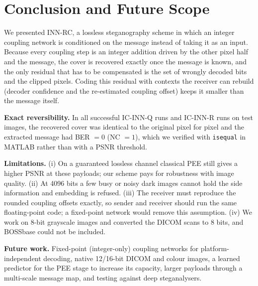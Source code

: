 \section{Conclusion and Future Scope}
We presented INN-RC, a lossless steganography scheme in which an integer coupling network is conditioned on the
message instead of taking it as an input. Because every coupling step is an integer addition driven by the other pixel
half and the message, the cover is recovered exactly once the message is known, and the only residual that has to be
compensated is the set of wrongly decoded bits and the clipped pixels. Coding this residual with contexts the receiver
can rebuild (decoder confidence and the re-estimated coupling offset) keeps it smaller than the message itself.

\textbf{Exact reversibility.} In all \exactQ{} successful IC-INN-Q runs and \exactR{} IC-INN-R runs on \nImgs{} test
images, the recovered cover was identical to the original pixel for pixel and the extracted message had BER $=0$
(NC $=1$), which we verified with \texttt{isequal} in MATLAB rather than with a PSNR threshold.

\textbf{Limitations.} (i) On a guaranteed lossless channel classical PEE still gives a higher PSNR at these payloads;
our scheme pays for robustness with image quality. (ii) At 4096 bits a few busy or noisy dark images cannot hold the
side information and embedding is refused. (iii) The receiver must reproduce the rounded coupling offsets exactly, so
sender and receiver should run the same floating-point code; a fixed-point network would remove this assumption.
(iv) We work on 8-bit grayscale images and converted the DICOM scans to 8 bits, and BOSSbase could not be included.

\textbf{Future work.} Fixed-point (integer-only) coupling networks for platform-independent decoding, native 12/16-bit
DICOM and colour images, a learned predictor for the PEE stage to increase its capacity, larger payloads through a
multi-scale message map, and testing against deep steganalysers.
